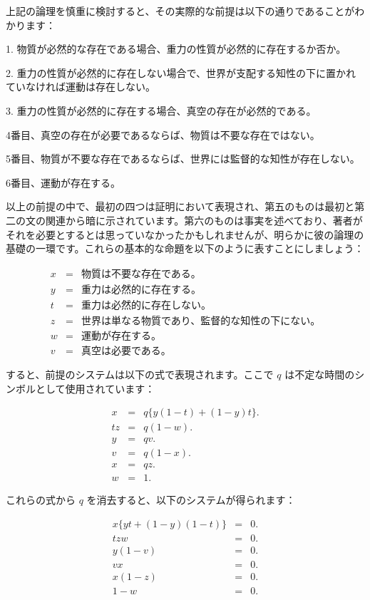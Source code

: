 \documentclass[a4paper,11pt,openany]{ltjsbook}
\begin{document}
上記の論理を慎重に検討すると、その実際的な前提は以下の通りであることがわかります：

1. 物質が必然的な存在である場合、重力の性質が必然的に存在するか否か。

2. 重力の性質が必然的に存在しない場合で、世界が支配する知性の下に置かれていなければ運動は存在しない。

3. 重力の性質が必然的に存在する場合、真空の存在が必然的である。

4番目、真空の存在が必要であるならば、物質は不要な存在ではない。

5番目、物質が不要な存在であるならば、世界には監督的な知性が存在しない。

6番目、運動が存在する。

以上の前提の中で、最初の四つは証明において表現され、第五のものは最初と第二の文の関連から暗に示されています。第六のものは事実を述べており、著者がそれを必要とするとは思っていなかったかもしれませんが、明らかに彼の論理の基礎の一環です。これらの基本的な命題を以下のように表すことにしましょう：

\begin{eqnarray*}
x &=& \text{物質は不要な存在である。} \\
y &=& \text{重力は必然的に存在する。} \\
t &=& \text{重力は必然的に存在しない。} \\
z &=& \text{世界は単なる物質であり、監督的な知性の下にない。} \\
w &=& \text{運動が存在する。} \\
v &=& \text{真空は必要である。}
\end{eqnarray*}

すると、前提のシステムは以下の式で表現されます。ここで $q$ は不定な時間のシンボルとして使用されています：

\begin{eqnarray*}
x &=& q\{y(1-t) + (1-y)t\}. \\
tz &=& q(1-w). \\
y &=& qv. \\
v &=& q(1-x). \\
x &=& qz. \\
w &=& 1.
\end{eqnarray*}

これらの式から $q$ を消去すると、以下のシステムが得られます：

\begin{eqnarray}
x\{yt+(1-y)(1-t)\} &=& 0.\\
tzw &=& 0. \\
y(1-v) &=& 0. \\
vx &=& 0. \\
x(1-z) &=& 0. \\
1-w &=& 0.
\end{eqnarray}
\end{document}
